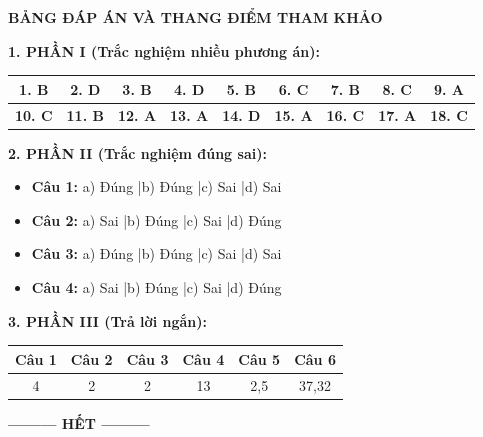 \documentclass[12pt,a4paper]{article}
\begin{document}
\newpage
\noindent
\textbf{\large BẢNG ĐÁP ÁN VÀ THANG ĐIỂM THAM KHẢO}
\smallskip

\noindent
\textbf{1. PHẦN I (Trắc nghiệm nhiều phương án):}
\begin{center}
\begin{tabular}{|c|c|c|c|c|c|c|c|c|}
\hline
\textbf{1. B} & \textbf{2. D} & \textbf{3. B} & \textbf{4. D} & \textbf{5. B} & \textbf{6. C} & \textbf{7. B} & \textbf{8. C} & \textbf{9. A} \\ \hline
\textbf{10. C} & \textbf{11. B} & \textbf{12. A} & \textbf{13. A} & \textbf{14. D} & \textbf{15. A} & \textbf{16. C} & \textbf{17. A} & \textbf{18. C} \\ \hline
\end{tabular}
\end{center}

\noindent
\textbf{2. PHẦN II (Trắc nghiệm đúng sai):}
\begin{itemize}
	\item \textbf{Câu 1:} a) Đúng \quad|\quad b) Đúng \quad|\quad c) Sai \quad|\quad d) Sai
	\item \textbf{Câu 2:} a) Sai \quad|\quad b) Đúng \quad|\quad c) Sai \quad|\quad d) Đúng
	\item \textbf{Câu 3:} a) Đúng \quad|\quad b) Đúng \quad|\quad c) Sai \quad|\quad d) Sai
	\item \textbf{Câu 4:} a) Sai \quad|\quad b) Đúng \quad|\quad c) Sai \quad|\quad d) Đúng
\end{itemize}

\noindent
\textbf{3. PHẦN III (Trả lời ngắn):}
\begin{center}
\begin{tabular}{|c|c|c|c|c|c|}
\hline
\textbf{Câu 1} & \textbf{Câu 2} & \textbf{Câu 3} & \textbf{Câu 4} & \textbf{Câu 5} & \textbf{Câu 6} \\ \hline
4 & 2 & 2 & 13 & 2,5 & 37,32 \\ \hline
\end{tabular}
\end{center}

\begin{center}
\textbf{--------- HẾT ---------}
\end{center}
\end{document}
